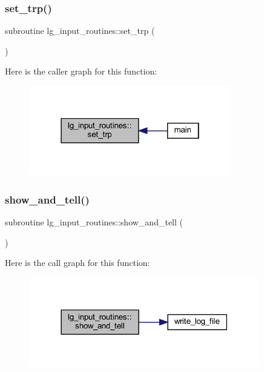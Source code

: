 \subsubsection{\texorpdfstring{set\+\_\+trp()}{set\_trp()}}
{\footnotesize\ttfamily subroutine lg\+\_\+input\+\_\+routines\+::set\+\_\+trp (\begin{DoxyParamCaption}{ }\end{DoxyParamCaption})}

Here is the caller graph for this function\+:\nopagebreak
\begin{figure}[H]
\begin{center}
\leavevmode
\includegraphics[width=250pt]{namespacelg__input__routines_aff8e77512771c5a25793784a8185d5b0_icgraph}
\end{center}
\end{figure}
\mbox{\label{namespacelg__input__routines_a46a4ddc163c46adad59e863dadde86a3}} 
\subsubsection{\texorpdfstring{show\+\_\+and\+\_\+tell()}{show\_and\_tell()}}
{\footnotesize\ttfamily subroutine lg\+\_\+input\+\_\+routines\+::show\+\_\+and\+\_\+tell (\begin{DoxyParamCaption}{ }\end{DoxyParamCaption})}

Here is the call graph for this function\+:\nopagebreak
\begin{figure}[H]
\begin{center}
\leavevmode
\includegraphics[width=285pt]{namespacelg__input__routines_a46a4ddc163c46adad59e863dadde86a3_cgraph}
\end{center}
\end{figure}
\mbox{\label{namespacelg__input__routines_abb4589f0c8ad2d2d88f0f52aac5462e6}} 
